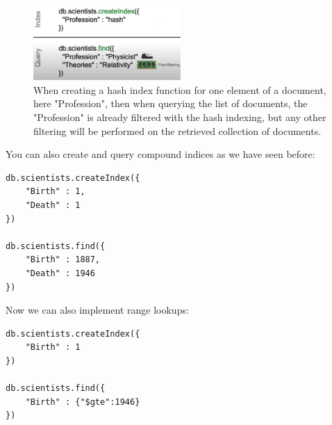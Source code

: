 \begin{figure}[h]
    \centering
    \includegraphics[width=0.5\textwidth]{Figures/IndexCreationandQuery.png}
    \caption{When creating a hash index function for one element of a document, here "Profession", then when querying the list of documents, the "Profession" is already filtered with the hash indexing, but any other filtering will be performed on the retrieved collection of documents.}
\end{figure}

You can also create and query compound indices as we have seen before:
\begin{lstlisting}[style=neutral]
db.scientists.createIndex({
    "Birth" : 1,
    "Death" : 1
})

db.scientists.find({
    "Birth" : 1887,
    "Death" : 1946
})
\end{lstlisting}

Now we can also implement range lookups:
\begin{lstlisting}[style=neutral]
db.scientists.createIndex({
    "Birth" : 1
})

db.scientists.find({
    "Birth" : {"$gte":1946}
})
\end{lstlisting}